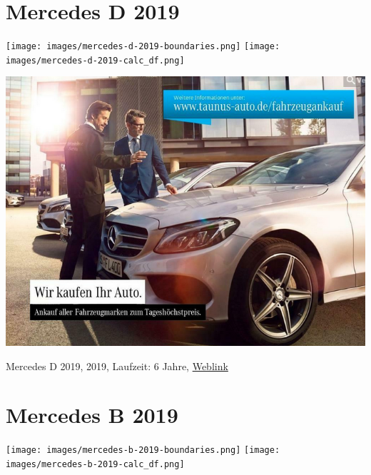 \documentclass[landscape, DIV=99, 14pt]{scrartcl}
\begin{document}
\pagebreak


\twocolumn

\section*{Mercedes D 2019}
\begin{center}
\texttt{[image: images/mercedes-d-2019-boundaries.png]}
\null
\vspace{0.5cm}
\texttt{[image: images/mercedes-d-2019-calc\_df.png]}
\end{center}

\pagebreak
\null
\vspace{2cm}
\begin{center}
\includegraphics[width=0.9\columnwidth]{cars/mercedes-c-220d-t.png}

Mercedes D 2019, 2019, Laufzeit: 6 Jahre, \href{https://suchen.mobile.de/fahrzeuge/details.html?action=parkItem&id=336723447}{Weblink}
\end{center}

\pagebreak


\twocolumn

\section*{Mercedes B 2019}
\begin{center}
\texttt{[image: images/mercedes-b-2019-boundaries.png]}
\null
\vspace{0.5cm}
\texttt{[image: images/mercedes-b-2019-calc\_df.png]}
\end{center}
\end{document}
